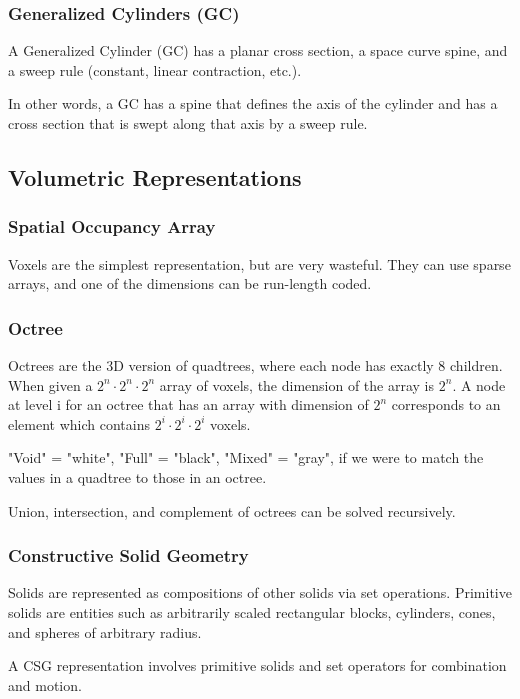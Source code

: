 \documentclass{article}
\begin{document}
\begin{multicols}{2}
\subsubsection{Generalized Cylinders (GC)}

A Generalized Cylinder (GC) has a planar cross section, a space curve spine, and a sweep rule (constant, linear contraction, etc.).

In other words, a GC has a spine that defines the axis of the cylinder and has a cross section that is swept along that axis by a sweep rule.

\subsection{Volumetric Representations}
\subsubsection{Spatial Occupancy Array}

Voxels are the simplest representation, but are very wasteful. They can use sparse arrays, and one of the dimensions can be run-length coded.

\subsubsection{Octree}

Octrees are the 3D version of quadtrees, where each node has exactly 8 children. When given a $2^n \cdot 2^n \cdot 2^n$ array of voxels, the dimension of the array is $2^n$. A node at level i for an octree that has an array with dimension of $2^n$ corresponds to an element which contains $2^i \cdot 2^i \cdot 2^i$ voxels.

"Void" = "white", "Full" = "black", "Mixed" = "gray", if we were to match the values in a quadtree to those in an octree.

Union, intersection, and complement of octrees can be solved recursively.

\subsubsection{Constructive Solid Geometry}

Solids are represented as compositions of other solids via set operations. Primitive solids are entities such as arbitrarily scaled rectangular blocks, cylinders, cones, and spheres of arbitrary radius.

A CSG representation involves primitive solids and set operators for combination and motion.


\end{multicols}
\end{document}
